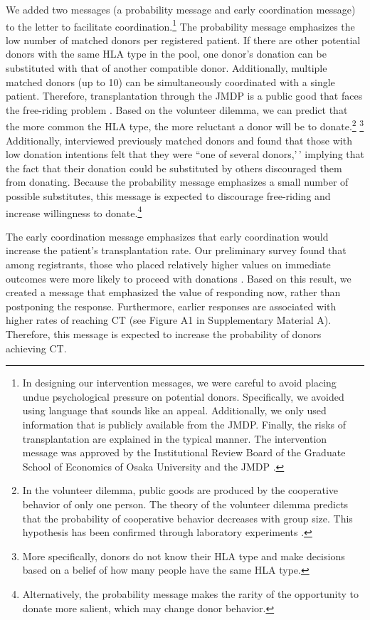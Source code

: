 \documentclass[12pt, a4paper]{article}
\begin{document}
We added two messages (a probability message and early coordination message) to the letter to facilitate coordination.\footnote{In designing our intervention messages, we were careful to avoid placing undue psychological pressure on potential donors. Specifically, we avoided using language that sounds like an appeal. Additionally, we only used information that is publicly available from the JMDP. Finally, the risks of transplantation are explained in the typical manner. The intervention message was approved by the Institutional Review Board of the Graduate School of Economics of Osaka University and the JMDP .} The probability message emphasizes the low number of matched donors per registered patient. If there are other potential donors with the same HLA type in the pool, one donor's donation can be substituted with that of another compatible donor. Additionally, multiple matched donors (up to 10) can be simultaneously coordinated with a single patient. Therefore, transplantation through the JMDP is a public good that faces the free-riding problem \citep{Bergstrom2009}. Based on the volunteer dilemma, we can predict that the more common the HLA type, the more reluctant a donor will be to donate.\footnote{In the volunteer dilemma, public goods are produced by the cooperative behavior of only one person. The theory of the volunteer dilemma predicts that the probability of cooperative behavior decreases with group size. This hypothesis has been confirmed through laboratory experiments \citep{Diekmann1985, Diekmann1986, Goeree2017}.} \footnote{More specifically, donors do not know their HLA type and make decisions based on a belief of how many people have the same HLA type.} Additionally, \citet{Kurosawa2022} interviewed previously matched donors and found that those with low donation intentions felt that they were ``one of several donors,'\,' implying that the fact that their donation could be substituted by others discouraged them from donating. Because the probability message emphasizes a small number of possible substitutes, this message is expected to discourage free-riding and increase willingness to donate.\footnote{Alternatively, the probability message makes the rarity of the opportunity to donate more salient, which may change donor behavior.}

The early coordination message emphasizes that early coordination would increase the patient's transplantation rate. Our preliminary survey found that among registrants, those who placed relatively higher values on immediate outcomes were more likely to proceed with donations \citep{Ohtake2020}. Based on this result, we created a message that emphasized the value of responding now, rather than postponing the response. Furthermore, earlier responses are associated with higher rates of reaching CT (see Figure A1 in Supplementary Material A). Therefore, this message is expected to increase the probability of donors achieving CT.
\end{document}
